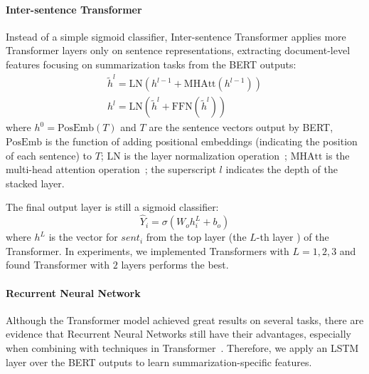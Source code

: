 \documentclass[11pt,a4paper]{article}
\begin{document}
    
    
    \paragraph{Inter-sentence Transformer}
    Instead of a simple sigmoid classifier, Inter-sentence Transformer applies more Transformer layers only on sentence representations, extracting document-level features focusing on  summarization tasks from the BERT outputs:
    \begin{gather}
    \tilde{h}^l=\mathrm{LN}(h^{l-1}+\mathrm{MHAtt}(h^{l-1}))\\
    h^l=\mathrm{LN}(\tilde{h}^l+\mathrm{FFN}(\tilde{h}^l))
    \end{gather}
    where $h^0=\mathrm{PosEmb}(T)$ and $T$ are the sentence vectors output by BERT, $\mathrm{PosEmb}$ is the function of adding positional embeddings (indicating the position of each sentence) to $T$;
    $\mathrm{LN}$ is the layer normalization operation~\cite{ba2016layer}; $\mathrm{MHAtt}$ is the multi-head attention operation~\cite{vaswani2017attention};
    the superscript $l$ indicates the depth of the stacked layer.
    
    The final output layer is still a sigmoid classifier:
    \begin{equation}
    \hat{Y}_i = \sigma(W_oh_i^L+b_o)
    \end{equation}
    where $h^L$ is the vector for $sent_i$ from the top layer (the $L$-th layer ) of the Transformer. In experiments, we implemented Transformers with $L=1, 2, 3$  and found Transformer with $2$ layers performs the best.
    
    \paragraph{Recurrent Neural Network}
    Although the Transformer model achieved great results on several tasks, there are evidence that Recurrent Neural Networks  still have their advantages, especially when combining with techniques in Transformer~\cite{chen2018best}. Therefore, we apply an LSTM layer over the BERT outputs to learn summarization-specific features. 
    
\end{document}
